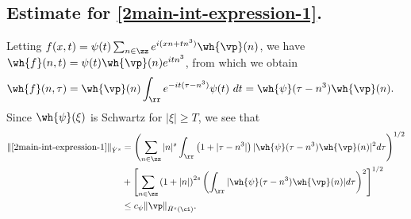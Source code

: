 \subsection{Estimate for \eqref{2main-int-expression-1}.}
%
%
Letting $f(x,t) = \psi(t) \sum_{n \in \zz} e^{i(xn + tn^{3})} 
\wh{\vp}(n)$, we have $\wh{f}(n,t) = \psi(t) \wh{\vp}(n) e^{itn^{3}}$,
from which we obtain
%
%
\begin{equation}
	\label{2fourier-trans-calc}
	\begin{split}
		\wh{f}(n, \tau)
		& = \wh{\vp}(n) \int_\rr e^{-it( \tau - n^{3})} 
		\psi(t) \ d t
		= \wh{\psi}(\tau - n^{3}) \wh{\vp}(n).
	\end{split}
\end{equation}
%
%
%
%
%
%
Since $\wh{\psi}(\xi)$ is Schwartz for $|\xi| \ge T$, we see that 
%
%
\begin{equation}
	\begin{split}
	\label{2main-int1-est}
		\|\eqref{2main-int-expression-1}\|_{\dot{Y}^s}
		& = \left (  \sum_{n\in \zz} |n|^s \int_\rr \left( 1 + | \tau - n^{3} 
		| \right )
		| \wh{\psi}(\tau - n^{3}) \wh{\vp}(n) |^2 d \tau \right)^{1/2} 
		\\
		& + \left[ \sum_{n \in \zz }\left( 1 + | n | \right)^{2s} \left( \int_{\rr} |
		\wh{\psi}(\tau - n^{3})\wh{\vp}(n) | d \tau
		\right)^{2} \right]^{1/2}
		\\
		& \le c_{\psi}
		\|\vp\|_{\dot{H}^s(\ci)}.
	\end{split}
\end{equation}
%
%
%
%
